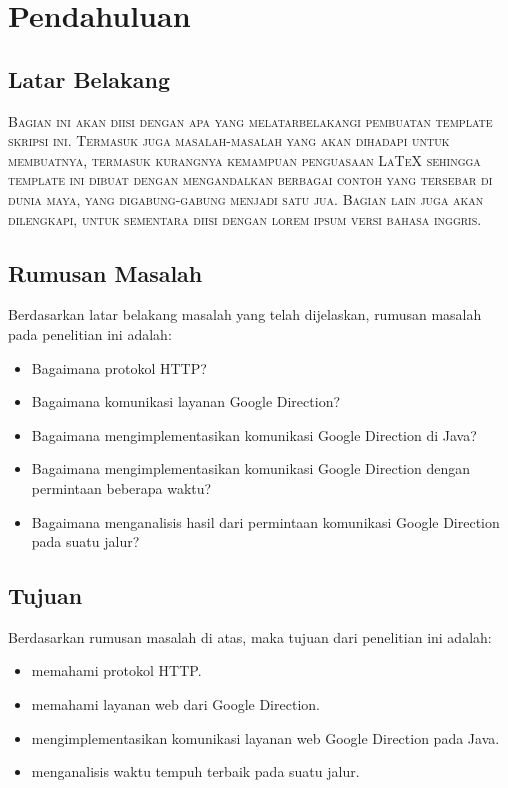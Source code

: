 \chapter{Pendahuluan}
\label{chap:intro}
   
\section{Latar Belakang}
\label{sec:label}
\textsc{
Bagian ini akan diisi dengan apa yang melatarbelakangi pembuatan template skripsi ini.
Termasuk juga masalah-masalah yang akan dihadapi untuk membuatnya, termasuk kurangnya kemampuan penguasaan \LaTeX{} sehingga template ini dibuat dengan mengandalkan berbagai contoh yang tersebar di dunia maya, yang digabung-gabung menjadi satu jua.
Bagian lain juga akan dilengkapi, untuk sementara diisi dengan lorem ipsum versi bahasa inggris.
}

\kant[5-10]

\section{Rumusan Masalah}
\label{sec:rumusan}
Berdasarkan latar belakang masalah yang telah dijelaskan, rumusan masalah pada penelitian ini adalah:
\begin{itemize}
	\item Bagaimana protokol HTTP?
	\item Bagaimana komunikasi layanan Google Direction?
	\item Bagaimana mengimplementasikan komunikasi Google Direction di Java?
	\item Bagaimana mengimplementasikan komunikasi Google Direction dengan permintaan beberapa waktu?
	\item Bagaimana menganalisis hasil dari permintaan komunikasi Google Direction pada suatu jalur?
\end{itemize}

\section{Tujuan}
\label{sec:tujuan}
Berdasarkan rumusan masalah di atas, maka tujuan dari penelitian ini adalah:
\begin{itemize}
	\item memahami protokol HTTP.
	\item memahami layanan web dari Google Direction.
	\item mengimplementasikan komunikasi layanan web Google Direction pada Java.
	\item menganalisis waktu tempuh terbaik pada suatu jalur.
\end{itemize}

